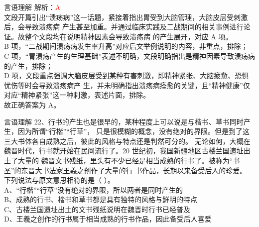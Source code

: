 \documentclass[aspectratio=169]{beamer}
\begin{document}
\begin{frame}[t]{言语理解}
    解析：\textcolor{red}{A}\\
    文段开篇引出“溃疡病”这一话题，紧接着指出胃受到大脑管理，大脑皮层受刺激后，会导致溃疡病
产生甚至加重。并通过临床实践及二战期间的相关事例进行论证。故整个文段均在说明精神因素会导致溃疡病
的产生展开，对应 A 项。\\
B 项，“二战期间溃疡病发生率升高”对应后文举例说明的内容，非重点，排除；\\
C 项，“胃溃疡产生的生理基础”表述不明确，文段明确指出是精神因素导致溃疡病的产生，排除；\\
D 项，文段重点强调大脑皮层受到某种有害刺激，即精神紧张、大脑疲惫、恐惧忧伤等时会导致溃疡病产
生，并未明确指出溃疡病痊愈的关键，且“精神健康”仅对应“精神紧张”这一种刺激，表述片面，排除。\\
故正确答案为 A。\\
\end{frame}




\begin{frame}[t]{言语理解}
22、行书的产生也是很早的，某种程度上可以说是与楷书、草书同时产生，因为所谓“行楷”“行草”，
只是很模糊的概念，没有绝对的界限。但是到了这三大书体各自成熟之后，彼此的风格与特点还是判然可分的。
无论如何，大概在魏晋时代，行书就开始在民间流行了。20 世纪初，我国新疆地区古楼兰国遗址出土了大量的
魏晋文书残纸，里头有不少已经是相当成熟的行书了。被称为“书圣”的东晋大书法家王羲之创作了大量的行
书作品，长期以来备受后人的珍爱。\\
下列说法与原文意思相符的是（ ）。\\
A、“行楷”“行草”没有绝对的界限，所以两者是同时产生的\\
B、成熟的行书、楷书和草书都是具有独特的风格与鲜明的特点\\
C、古楼兰国遗址出土的文书残纸说明在魏晋时行书已经普及\\
D、王羲之创作的行书属于相当成熟的行书作品，因此备受后人喜爱\\
\end{frame}
\end{document}
